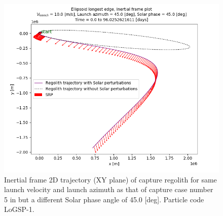 \FloatBarrier
\begin{figure}[htb]
\centering
\captionsetup{justification=centering}
\includegraphics[scale=0.60]{longest_edge_perturbations/3.2Density_1cmSize/srpEscape_comparative_10ms_45Azimuth_45SolarPhase_inertialFrame.png}
\caption{Inertial frame 2D trajectory (XY plane) of capture regolith for same launch velocity and launch azimuth as that of capture case number 5 in  but a different Solar phase angle of 45.0 [deg]. Particle code LoGSP-1.}
\label{fig:LoGSP_1_capture_case_5_2d_trajectory_comparative_srpEscape}
\end{figure}
\FloatBarrier
